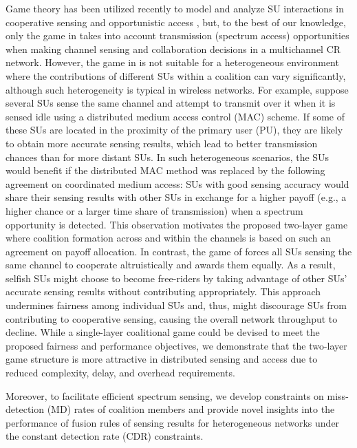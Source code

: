 \documentclass[journal,draftclsnofoot,onecolumn]{IEEEtran}
\theoremstyle{definition}
\begin{document}
Game theory has been utilized recently to model and analyze SU interactions in cooperative sensing \cite{PartitionFormSenseGame,RLiuEvoGame,ZHanCoalSenseGame,MultiChCoalSenseGame,FairPayoff,AuctionBased,Overlapp,HedonicSenseGame} and opportunistic access \cite{HedonicSenseGame,NetwEcon,JWangChSelSurvey}, but, to the best of our knowledge, only the game in \cite{HedonicSenseGame} takes into account transmission (spectrum access) opportunities when making channel sensing and collaboration decisions in a multichannel CR network. However, the game in \cite{HedonicSenseGame} is not suitable for a heterogeneous environment where the contributions of different SUs within a coalition can vary significantly, although such heterogeneity is typical in wireless networks. For example, suppose several SUs sense the same channel and attempt to transmit over it when it is sensed idle using a distributed medium access control (MAC) scheme. If some of these SUs are located in the proximity of the primary user (PU), they are likely to obtain more accurate sensing results, which lead to better transmission chances than for more distant SUs. In such heterogeneous scenarios, the SUs would benefit if the distributed MAC method was replaced by the following agreement on coordinated medium access: SUs with good sensing accuracy would share their sensing results with other SUs in exchange for a higher payoff (e.g., a higher chance or a larger time share of transmission) when a spectrum opportunity is detected. This observation motivates the proposed two-layer game where coalition formation across and within the channels is based on such an agreement on payoff allocation. In contrast, the game of \cite{HedonicSenseGame} forces all SUs sensing the same channel to cooperate altruistically and awards them equally. As a result, selfish SUs might choose to become free-riders \cite{RLiuEvoGame} by taking advantage of other SUs' accurate sensing results without contributing appropriately. This approach undermines fairness among individual SUs and, thus, might discourage SUs from contributing to cooperative sensing, causing the overall network throughput to decline. While a single-layer coalitional game could be devised to meet the proposed fairness and performance objectives, we demonstrate that the two-layer game structure is more attractive in distributed sensing and access due to reduced complexity, delay, and overhead requirements.

Moreover, to facilitate efficient spectrum sensing, we develop constraints on miss-detection (MD) rates of coalition members and provide novel insights into the performance of fusion rules of sensing results for heterogeneous networks under the constant detection rate (CDR) \cite{YCLiangWCNC} constraints.
\end{document}

